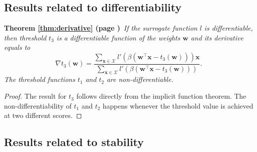 \documentclass[]{interact}
\theoremstyle{plain}%
\theoremstyle{definition}
\theoremstyle{remark}
\newcommand{\Xcal}{\mathcal{X}}
\newcommand{\theoremNN}[2]{\noindent\textbf{Theorem \ref{#1} (page \pageref{#1})}\ \emph{#2}}
\begin{document}
\subsection{Results related to differentiability}


\theoremNN{thm:derivative}{If the surrogate function $l$ is differentiable, then threshold $t_3$ is a differentiable function of the weights $\bm w$ and its derivative equals to
  $$
    \nabla t_3(\bm w) = \frac{\sum_{\bm x\in\Xcal}l'(\beta(\bm w^\top \bm x-t_3(\bm w)))\bm x}{\sum_{\bm x\in\Xcal}l'(\beta(\bm w^\top \bm x-t_3(\bm w)))}.
  $$
  The threshold functions $t_1$ and $t_2$ are non-differentiable.}
\begin{proof}
  The result for $t_3$ follows directly from the implicit function theorem. The non-differentiability of $t_1$ and $t_2$ happens whenever the threshold value is achieved at two different scores.
\end{proof}



\subsection{Results related to stability}
\end{document}
